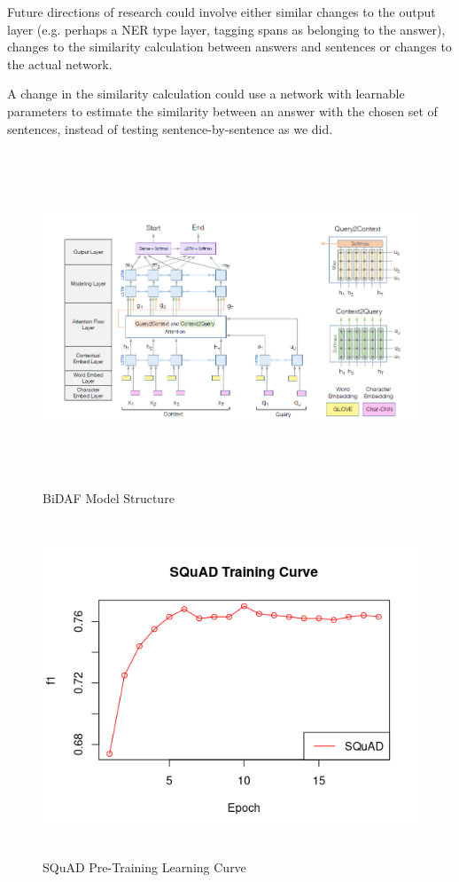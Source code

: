 \documentclass[12pt, a4paper]{article}
\begin{document}
\begin{multicols}{2}
			Future directions of research could involve either similar changes to the output layer (e.g. perhaps a NER type layer, tagging spans as belonging to the answer), changes to the similarity calculation between answers and sentences or changes to the actual network.
			
			A change in the similarity calculation could use a network with learnable parameters to estimate the similarity between an answer with the chosen set of sentences, instead of testing sentence-by-sentence as  we did.
		
	\end{multicols}

	\begin{figure}
		\includegraphics[width=\textwidth,height=10cm]{images/BiDAF.png}
		\caption{BiDAF Model Structure}
	\end{figure}
	
	\begin{figure}
		\includegraphics[width=\textwidth,height=10cm]{images/squad.png}
		\caption{SQuAD Pre-Training Learning Curve}
	\end{figure}
	
\end{document}
